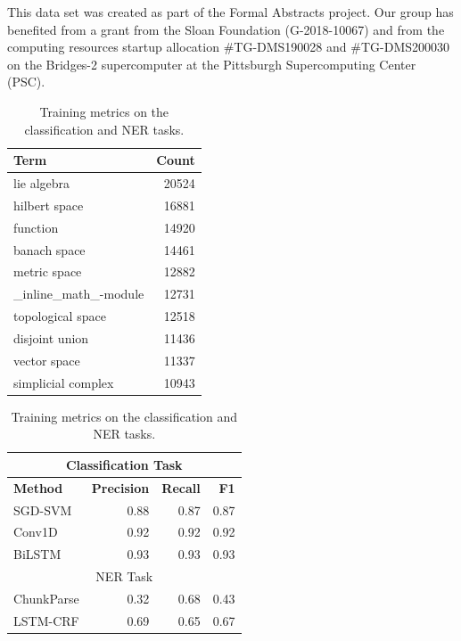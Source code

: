 \documentclass[submission,copyright,creativecommons]{eptcs}
\begin{document}
This data set was created  as part of the Formal Abstracts project.
Our group has benefited from a grant from the Sloan  Foundation
(G-2018-10067) and from the computing resources startup allocation
\#TG-DMS190028 and \#TG-DMS200030 on the Bridges-2
supercomputer at the Pittsburgh Supercomputing Center (PSC).
\begin{table}[h]
    \centering
    \begin{minipage}{0.45\textwidth}
    \small
\centering
\begin{tabular}{lr}
    \hline \textbf{Term} &  \textbf{Count} \\ \hline
lie algebra & 20524 \\
hilbert space & 16881 \\
function & 14920 \\
banach space & 14461 \\
metric space & 12882 \\
\_inline\_math\_-module & 12731 \\
topological space & 12518 \\
disjoint union & 11436 \\
vector space & 11337 \\
simplicial complex & 10943 \\
\hline

\end{tabular}
\caption{\label{term-cnt-tab} Most common multiword entries in the data base. }
        \end{minipage}\hfill
    \begin{minipage}{0.45\textwidth}
    \small
\centering
\begin{tabular}{lrrr}
    \hline
    \multicolumn{4}{c}{Classification Task} \\
    \hline
\textbf{Method}  & \textbf{Precision} &  \textbf{Recall} & \textbf{F1}\\ 
\hline
    SGD-SVM & 0.88 & 0.87 & 0.87 \\
    Conv1D & 0.92 & 0.92 & 0.92 \\
    BiLSTM & 0.93 & 0.93 & 0.93 \\
     \hline
    \hline
    \multicolumn{4}{c}{NER Task} \\
    \hline
    ChunkParse & 0.32 & 0.68 & 0.43 \\
    LSTM-CRF & 0.69 & 0.65 & 0.67 \\
    \hline
\end{tabular}
\caption{\label{metric-comp} Training metrics on the classification and NER tasks.}
\end{minipage}
\end{table}
\end{document}
